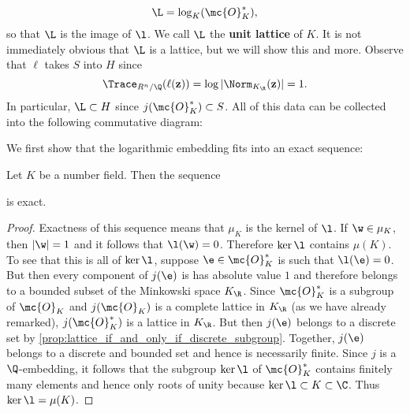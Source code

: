     \[
      \L = \log_{K}(\mc{O}_{K}^{\ast}),
    \]
    so that $\L$ is the image of $\l$. We call $\L$ the \textbf{unit lattice} of $K$. It is not immediately obvious that $\L$ is a lattice, but we will show this and more. Observe that $\ell$ takes $S$ into $H$ since
    \[
      \Trace_{R^{n}/\Q}(\ell(\mathbf{z})) = \log|\Norm_{K_{\R}}(\mathbf{z})| = 1.
    \]
    In particular, $\L \subset H$ since $j(\mc{O}_{K}^{\ast}) \subset S$. All of this data can be collected into the following commutative diagram:

    \begin{center}
    \end{center}
    
    We first show that the logarithmic embedding fits into an exact sequence:

    \begin{proposition}\label{prop:exact_sequence_for_Dirichlets_unit_theorem}
      Let $K$ be a number field. Then the sequence

      \begin{center}
      \end{center}

      is exact.
    \end{proposition}
    \begin{proof}
      Exactness of this sequence means that $\mu_{K}$ is the kernel of $\l$. If $\w \in \mu_{K}$, then $|\w| = 1$ and it follows that $\l(\w) = 0$. Therefore $\ker\l$ contains $\mu(K)$. To see that this is all of $\ker\l$, suppose $\e \in \mc{O}_{K}^{\ast}$ is such that $\l(\e) = 0$. But then every component of $j(\e)$ is has absolute value $1$ and therefore belongs to a bounded subset of the Minkowski space $K_{\R}$. Since $\mc{O}_{K}^{\ast}$ is a subgroup of $\mc{O}_{K}$ and $j(\mc{O}_{K})$ is a complete lattice in $K_{\R}$ (as we have already remarked), $j(\mc{O}_{K}^{\ast})$ is a lattice in $K_{\R}$. But then $j(\e)$ belongs to a discrete set by \cref{prop:lattice_if_and_only_if_discrete_subgroup}. Together, $j(\e)$ belongs to a discrete and bounded set and hence is necessarily finite. Since $j$ is a $\Q$-embedding, it follows that the subgroup $\ker\l$ of $\mc{O}_{K}^{\ast}$ contains finitely many elements and hence only roots of unity because $\ker\l \subset K \subset \C$. Thus $\ker\l = \mu(K)$.
    \end{proof}

